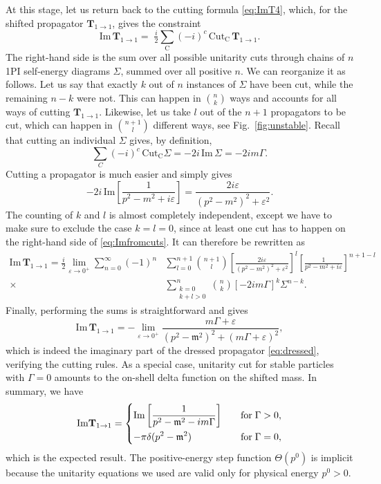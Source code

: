 \documentclass[12pt]{article}
\numberwithin{figure}{section}
\def \be {\begin{equation}}
\def \ee {\end{equation}}
\def \nn {\nonumber}
\def \CC {C}
\def \eps {\varepsilon}
\def \CC {\mathrm{C}}
\def \Im {\mathrm{Im}}
\def \Cut {\mathrm{Cut}}
\def \T {\mathbf{T}}
\def \m {\mathfrak{m}}
\newcommand{\cut}{\text{Cut}}
\begin{document}
    At this stage, let us return back to the cutting formula \eqref{eq:ImT4}, which,
    for the shifted propagator $\T_{1\to 1}$, gives the constraint
    \be
	\Im\, \T_{1\to 1} =
	\;
	\tfrac{i}{2} 
	\sum_{\CC}
	\left(-i\right)^c \, \cut_{\mathrm{C}} \, \T_{1 \to 1}.
	\label{eq:Imfromcuts}
	\ee
    The right-hand side is the sum over all possible unitarity cuts through chains of $n$ 1PI self-energy diagrams $\Sigma$, summed over all positive $n$. We can reorganize it as follows. Let us say that exactly $k$ out of $n$ instances of $\Sigma$ have been cut, while the remaining $n{-}k$ were not. This can happen in $\binom{n}{k}$ ways and accounts for all ways of cutting $\T_{1\to 1}$. Likewise, let us take $l$ out of the $n+1$ propagators to be cut, which can happen in $\binom{n+1}{l}$ different ways, see Fig.~\ref{fig:unstable}. Recall that cutting an individual $\Sigma$ gives, by definition,
    \be
    \sum_{C} (-i)^c\, \Cut_{\mathrm{C}} \Sigma = -2i\, \Im\, \Sigma  =  -2i m \Gamma.
    \ee
    Cutting a propagator is much easier and simply gives
    \be
    -2i\, \Im \left[ \frac{1}{p^2 - m^2 + i\eps} \right] = \frac{2i\eps}{(p^2 - m^2)^2 + \eps^2}.
    \ee
    The counting of $k$ and $l$ is almost completely independent, except we have to make sure to exclude the case $k=l=0$, since at least one cut has to happen on the right-hand side of \eqref{eq:Imfromcuts}.
    It can therefore be rewritten as
    \begin{align}\label{eq:cut-sum}
    \Im\, \T_{1\to 1} = \tfrac{i}{2} \lim_{\eps \to 0^+} \sum_{n=0}^{\infty} (-1)^n &\sum_{l=0}^{n+1} \binom{n{+}1}{l}  \left[\frac{2i \eps}{(p^2 - m^2)^2 + \eps^2}\right]^{l} \left[ \frac{1}{p^2 - m^2 + i\eps} \right]^{n+1-l} \nn\\
    \times &\!\!\sum_{\substack{k=0\\ k+l > 0}}^{n} \binom{n}{k} \left[ -2i m\Gamma \right]^{k} \Sigma^{n-k} .
    \end{align}
    Finally, performing the sums is straightforward and gives
    \be 
    \Im\, \T_{1\to 1} = - \lim_{\eps \to 0^+}
        \frac{m \Gamma + \eps}{(p^2-\m^2)^2 + (m\Gamma + \eps)^2},
    \ee 
    which is indeed the imaginary part of the dressed propagator \eqref{eq:dressed}, verifying the cutting rules. As a special case, unitarity cut for stable particles with $\Gamma = 0$ amounts to the on-shell delta function on the shifted mass. In summary, we have
    \be\label{eq:ImT11}
    \Im \T_{1 \to 1}  = \begin{dcases}
    \Im \left[ \frac{1}{p^2 - \m^2 - im\Gamma} \right] \quad &\mathrm{for }\; \Gamma>0,\\
    -\pi \delta(p^2 - \m^2) &\mathrm{for }\; \Gamma=0,
    \end{dcases}
    \ee
    which is the expected result. The positive-energy step function $\Theta(p^0)$ is implicit because the unitarity equations we used are valid only for physical energy $p^0 > 0$.
    
\end{document}
